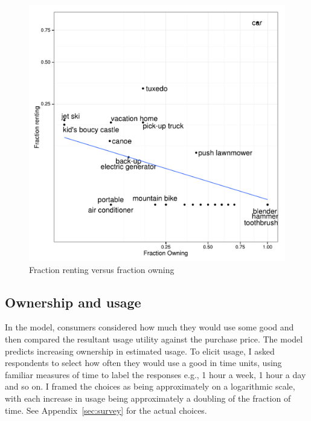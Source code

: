 \documentclass[11pt]{article}
\begin{document}
\begin{figure}
\centering 
\caption{Fraction renting versus fraction owning \label{fig:scatter} }
\begin{minipage}{0.60 \linewidth}
\includegraphics[width = \linewidth]{./plots/scatter_rent_v_own.pdf} 
\end{minipage} 
\end{figure} 



\subsection{Ownership and usage} 
In the model, consumers considered how much they would use some good and then compared the resultant usage utility against the purchase price. 
The model predicts increasing ownership in estimated usage. 
To elicit usage, I asked respondents to select how often they would use a good in time units, using familiar measures of time to label the responses e.g., 1 hour a week, 1 hour a day and so on.
I framed the choices as being approximately on a logarithmic scale, with each increase in usage being approximately a doubling of the fraction of time. See Appendix~\ref{sec:survey} for the actual choices.   
\end{document}

